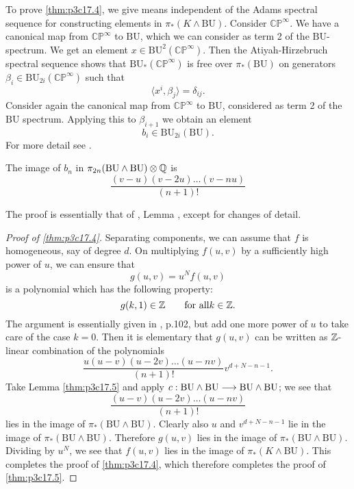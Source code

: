 \documentclass[../main]{subfiles}
\begin{document}
To prove \ref{thm:p3c17.4}, we give means independent of the Adams spectral sequence for constructing elements in $\pi_\ast(K \wedge \mathrm{BU})$. Consider $\mathbb {CP}^\infty$. We have a canonical map from $\mathbb {CP}^\infty$ to $\mathrm{BU}$, which we can consider as term 2 of the $\mathrm{BU}$-spectrum. We get an element $x \in \mathrm{BU}^2(\mathbb {CP}^\infty)$. Then the Atiyah-Hirzebruch spectral sequence shows that $\mathrm{BU}_\ast(\mathbb {CP}^\infty)$ is free over $\pi_\ast(\mathrm{BU})$ on generators $\beta_i \in \mathrm{BU}_{2i}(\mathbb {CP}^\infty)$ such that $$\langle x^i, \beta_j\rangle = \delta_{ij}.$$ Consider again the canonical map from $\mathbb {CP}^\infty$ to $\mathrm{BU}$, considered as term 2 of the $\mathrm{BU}$ spectrum. Applying this to $\beta_{i + 1}$ we obtain an element $$b_i \in \mathrm{BU}_{2i}(\mathrm{BU}).$$ For more detail see \plscite{[2]}.

\begin{lemma}
The image of $b_n$ in $\pi_{2n}(\mathrm{BU} \wedge \mathrm{BU}) \otimes \mathbb{Q}$ is $$\frac {(v - u)(v - 2u) \ldots (v - nu)} {(n + 1)!}$$
\end{lemma}

The proof is essentially that of \plscite{[2]}, Lemma , except for changes of detail. 

\begin{proof}[Proof of \ref{thm:p3c17.4}]
Separating components, we can assume that $f$ is homogeneous, say of degree $d$. On multiplying $f(u, v)$ by a sufficiently high power of $u$, we can ensure that $$g(u,v) = u^N f(u, v)$$ is a polynomial which has the following property: $$g(k, 1) \in \mathbb{Z} \qquad \text {for all} k \in \mathbb{Z}.$$ The argument is essentially given in \plscite{[2]}, p.102, but add one more power of $u$ to take care of the case $k = 0$. Then it is elementary that $g(u, v)$ can be written as $\mathbb{Z}$-linear combination of the polynomials $$\frac {u(u - v)(u - 2v) \ldots (u - nv)} {(n + 1)!} v^{d + N - n - 1}.$$ 
Take Lemma \ref{thm:p3c17.5} and apply $c : \mathrm{BU} \wedge \mathrm{BU} \overset{}{\longrightarrow} \mathrm{BU} \wedge \mathrm{BU}$; we see that $$\frac {(u - v)(u - 2v) \ldots (u - nv)} {(n+1)!}$$ lies in the image of $\pi_\ast(\mathrm{BU} \wedge \mathrm{BU})$. Clearly also $u$ and $v^{d + N - n - 1}$ lie in the image of $\pi_\ast(\mathrm{BU} \wedge \mathrm{BU})$. Therefore $g(u, v)$ lies in the image of $\pi_\ast(\mathrm{BU} \wedge \mathrm{BU})$. Dividing by $u^N$, we see that $f(u,v)$ lies in the image of $\pi_\ast(K \wedge \mathrm{BU})$. This completes the proof of \ref{thm:p3c17.4}, which therefore completes the proof of \ref{thm:p3c17.5}. 
\end{proof}
\end{document}
